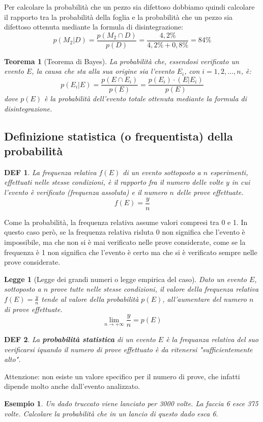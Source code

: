 \documentclass{article}     %
\newtheorem*{theorem}{Teorema}
\newtheorem*{definition}{DEF}
\newtheorem*{law}{Legge}
\newtheorem{ex}{Esempio}[section]
\begin{document}
                    Per calcolare la probabilità che un pezzo sia difettoso dobbiamo quindi calcolare il rapporto tra la probabilità della foglia e la probabilità che un pezzo sia difettoso ottenuta mediante la formula di disintegrazione:
                    \[p(M_2|D)=\frac{p(M_2\cap D)}{p(D)}=\frac{4,2\%}{4,2\%+0,8\%}=84\%\]
                    \begin{theorem}[Teorema di Bayes]
                        La probabilità che, essendosi verificato un evento $E$, la causa che sta alla sua origine sia l'evento $E_i$, con $i=1,2,\dots, n$, è:
                        \[p(E_i|E)=\frac{p(E\cap E_i)}{p(E)}=\frac{p(E_i)\cdotp(E|E_i)}{p(E)}\]
                        dove $p(E)$ è la probabilità dell'evento totale ottenuta mediante la formula di disintegrazione. 
                    \end{theorem}
                \subsection{Definizione statistica (o frequentista) della probabilità}
                    \begin{definition}
                        La frequenza relativa $f(E)$ di un evento sottoposto a $n$ esperimenti, effettuati nelle stesse condizioni, è il rapporto fra il numero delle volte $y$ in cui l'evento è verificato (frequenza assoluta) e il numero $n$ delle prove effettuate.
                        \[f(E)=\frac{y}{n}\]
                    \end{definition}
                    Come la probabilità, la frequenza relativa assume valori compresi tra 0 e 1. In questo caso però, se la frequenza relativa risluta 0 non significa che l'evento è impossibile, ma che non si è mai verificato nelle prove considerate, come se la frequenza è 1 non significa che l'evento è certo ma che si è verificato sempre nelle prove considerate. 
                    \begin{law}[Legge dei grandi numeri o legge empirica del caso]
                        Dato un evento $E$, sottoposto a $n$ prove tutte nelle stesse condizioni, il valore della frequenza relativa $f(E)=\frac{y}{n}$ tende al valore della probabilità $p(E)$, all'aumentare del numero $n$ di prove effettuate.
                        \[\lim_{n\rightarrow +\infty}\frac{y}{n}=p(E)\]
                    \end{law}
                    \begin{definition}
                        La \textbf{probabilità statistica} di un evento $E$ è la frequanza relativa del suo verificarsi iquando il numero di prove effettuato è da ritenersi "sufficientemente alto".
                    \end{definition}
                    Attenzione: non esiste un valore specifico per il numero di prove, che infatti dipende molto anche dall'evento analizzato. 
                    \begin{ex}
                        Un dado truccato viene lanciato per 3000 volte. La faccia 6 esce 375 volte. Calcolare la probabilità che in un lancio di questo dado esca 6.
                    \end{ex}
                    
\end{document}
